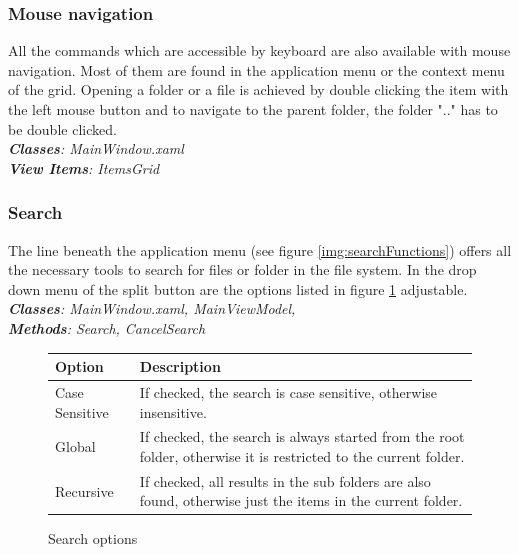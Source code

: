 \documentclass[JCDReport.tex]{subfiles}
\begin{document}
\subsubsection{Mouse navigation}
All the commands which are accessible by keyboard are also available with mouse navigation.
Most of them are found in the application menu or the context menu of the grid. Opening a folder or a file is achieved by double clicking the item with the left mouse button and to navigate to the parent folder, the folder ".." has to be double clicked. \\
\textit{\textbf{Classes}: MainWindow.xaml\\
\textbf{View Items}: ItemsGrid}

\subsubsection{Search}	
The line beneath the application menu (see figure \ref{img:searchFunctions}) offers all the necessary tools to search for files or folder in the file system. In the drop down menu of the split button are the options listed in figure \ref{tbl:searchOptions} adjustable.\\
\textit{\textbf{Classes}: MainWindow.xaml, MainViewModel, \\
\textbf{Methods}: Search, CancelSearch}

\begin{figure}[h!]
	\centering
	\begin{tabular}{| l | p{10cm} |}
		\hline
		\textbf{Option} & \textbf{Description} \\ \hline \hline
		Case Sensitive & If checked, the search is case sensitive, otherwise insensitive. \\ \hline
		Global & If checked, the search is always started from the root folder, otherwise it is restricted to the current folder. \\ \hline
		Recursive & If checked, all results in the sub folders are also found, otherwise just the items in the current folder. \\ \hline
		\end{tabular}
	\caption{Search options}
	\label{tbl:searchOptions}
\end{figure}
\end{document}
